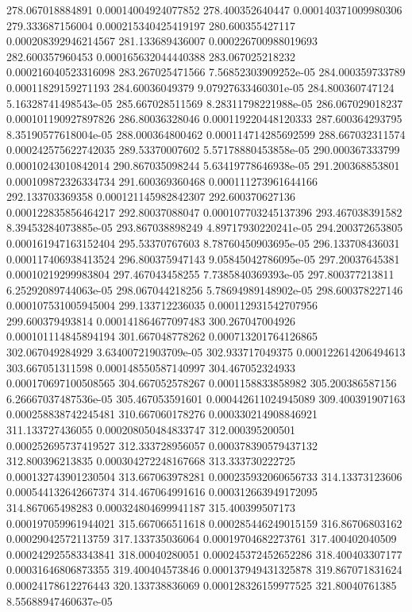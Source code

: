 {278.067018884891 0.00014004924077852
278.400352640447 0.000140371009980306
279.333687156004 0.000215340425419197
280.600355427117 0.000208392946214567
281.133689436007 0.000226700988019693
282.600357960453 0.000165632044440388
283.067025218232 0.000216040523316098
283.267025471566 7.56852303909252e-05
284.000359733789 0.00011829159271193
284.60036049379 9.07927633460301e-05
284.800360747124 5.16328741498543e-05
285.667028511569 8.28311798221988e-05
286.067029018237 0.000101190927897826
286.80036328046 0.000119220448120333
287.600364293795 8.35190577618004e-05
288.000364800462 0.000114714285692599
288.667032311574 0.000242575622742035
289.53370007602 5.57178880453858e-05
290.000367333799 0.00010243010842014
290.867035098244 5.63419778646938e-05
291.200368853801 0.000109872326334734
291.600369360468 0.000111273961644166
292.133703369358 0.000121145982842307
292.600370627136 0.000122835856464217
292.80037088047 0.000107703245137396
293.467038391582 8.39453284073885e-05
293.867038898249 4.89717930220241e-05
294.200372653805 0.000161947163152404
295.53370767603 8.78760450903695e-05
296.133708436031 0.000117406938413524
296.800375947143 9.05845042786095e-05
297.20037645381 0.00010219299983804
297.467043458255 7.7385840369393e-05
297.800377213811 6.25292089744063e-05
298.067044218256 5.78694989148902e-05
298.600378227146 0.000107531005945004
299.133712236035 0.000112931542707956
299.600379493814 0.000141864677097483
300.267047004926 0.000101114845894194
301.667048778262 0.000713201764126865
302.067049284929 3.63400721903709e-05
302.933717049375 0.000122614206494613
303.667051311598 0.000148550587140997
304.467052324933 0.000170697100508565
304.667052578267 0.0001158833858982
305.200386587156 6.26667037487536e-05
305.467053591601 0.000442611024945089
309.400391907163 0.000258838742245481
310.667060178276 0.000330214908846921
311.133727436055 0.000208050484833747
312.000395200501 0.000252695737419527
312.333728956057 0.000378390579437132
312.800396213835 0.000304272248167668
313.333730222725 0.000132743901230504
313.667063978281 0.000235932060656733
314.13373123606 0.000544132642667374
314.467064991616 0.000312663949172095
314.867065498283 0.000324804699941187
315.400399507173 0.000197059961944021
315.667066511618 0.000285446249015159
316.86706803162 0.00029042572113759
317.133735036064 0.00019704682273761
317.400402040509 0.000242925583343841
318.00040280051 0.000245372452652286
318.400403307177 0.00031646806873355
319.400404573846 0.000137949431325878
319.867071831624 0.00024178612276443
320.133738836069 0.000128326159977525
321.80040761385 8.55688947460637e-05
}
